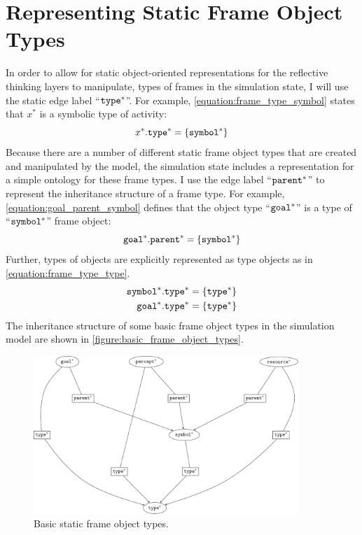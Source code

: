 \section{Representing Static Frame Object Types}

In order to allow for static object-oriented representations for the
reflective thinking layers to manipulate, types of frames in the
simulation state, I will use the static edge label
``$\text{\tt{type}}^*$''.  For example,
{\mbox{\autoref{equation:frame_type_symbol}}} states that $x^*$ is a
symbolic type of activity:
\begin{equation}
\label{equation:frame_type_symbol}
x^*.\text{\tt{type}}^* = \{\text{\tt{symbol}}^*\}
\end{equation}
Because there are a number of different static frame object types that
are created and manipulated by the model, the simulation state
includes a representation for a simple ontology for these frame types.
I use the edge label ``$\text{\tt{parent}}^*$'' to represent the
inheritance structure of a frame type.  For example,
{\mbox{\autoref{equation:goal_parent_symbol}}} defines that the object
type ``$\text{\tt{goal}}^*$'' is a type of ``$\text{\tt{symbol}}^*$''
frame object:
\begin{equation}
\label{equation:goal_parent_symbol}
  \text{\tt{goal}}^*.\text{\tt{parent}}^* = \{\text{\tt{symbol}}^*\}
\end{equation}
Further, types of objects are explicitly represented as type objects
as in {\mbox{\autoref{equation:frame_type_type}}}.
\begin{align}
\label{equation:frame_type_type}
  \text{\tt{symbol}}^*.\text{\tt{type}}^* &= \{\text{\tt{type}}^*\} \\
    \text{\tt{goal}}^*.\text{\tt{type}}^* &= \{\text{\tt{type}}^*\}
\end{align}
The inheritance structure of some basic frame object types in the
simulation model are shown in
{\mbox{\autoref{figure:basic_frame_object_types}}}.
\begin{figure}
\includegraphics[width=10cm]{gfx/basic_frame_object_types}
\caption{Basic static frame object types.}
\label{figure:basic_frame_object_types}
\end{figure}

